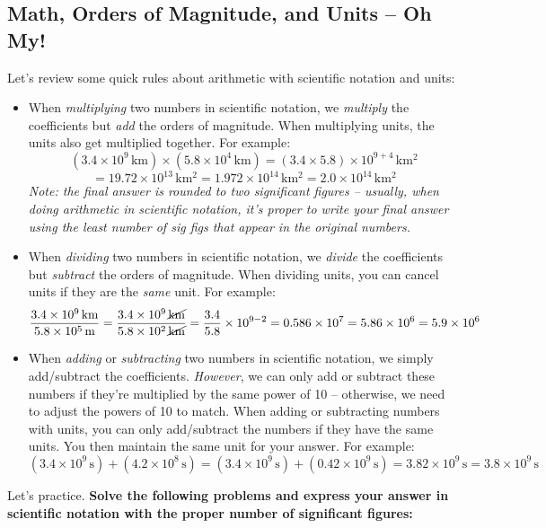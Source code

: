 \documentclass[11pt]{article}
\begin{document}
\subsection{Math, Orders of Magnitude, and Units -- Oh My!}

Let's review some quick rules about arithmetic with scientific notation and units:
\begin{itemize}
    \item When \textit{multiplying} two numbers in scientific notation, we \emph{multiply} the coefficients but \emph{add} the orders of magnitude. When multiplying units, the units also get multiplied together. For example:
    $$(3.4 \times 10^9 \,\mathrm{km}) \times (5.8 \times 10^4 \,\mathrm{km}) = (3.4 \times 5.8) \times 10^{9 + 4} \,\mathrm{km^2}$$ $$= 19.72 \times 10^{13} \,\mathrm{km^2} = 1.972 \times 10^{14} \,\mathrm{km^2} = 2.0 \times 10^{14}\,\mathrm{km^2}$$
    \textit{Note: the final answer is rounded to two significant figures -- usually, when doing arithmetic in scientific notation, it's proper to write your final answer using the \emph{least} number of sig figs that appear in the original numbers.}
    
    \item When \textit{dividing} two numbers in scientific notation, we \emph{divide} the coefficients but \emph{subtract} the orders of magnitude. When dividing units, you can cancel units if they are the \textit{same} unit. For example:
    $$\frac{3.4 \times 10^9 \,\mathrm{km}}{5.8 \times 10^5 \,\mathrm{m}} = \frac{3.4 \times 10^9 \,\cancel{\mathrm{km}}}{5.8 \times 10^2 \,\cancel{\mathrm{km}}} = \frac{3.4}{5.8} \times 10^{9-2} = 0.586 \times 10^7 = 5.86 \times 10^6 = 5.9 \times 10^6$$
    
    \item When \textit{adding} or \textit{subtracting} two numbers in scientific notation, we simply add/subtract the coefficients. \textit{However}, we can only add or subtract these numbers if they're multiplied by the same power of 10 -- otherwise, we need to adjust the powers of 10 to match. When adding or subtracting numbers with units, you can only add/subtract the numbers if they have the same units.  You then maintain the same unit for your answer. For example:
    $$(3.4 \times 10^9 \,\mathrm{s}) + (4.2 \times 10^8 \,\mathrm{s}) = (3.4 \times 10^9 \,\mathrm{s}) + (0.42 \times 10^9 \,\mathrm{s}) = 3.82 \times 10^9 \,\mathrm{s} = 3.8 \times 10^9 \,\mathrm{s}$$

\end{itemize}
\noindent
Let's practice.  \textbf{Solve the following problems and express your answer in scientific notation with the proper number of significant figures:}
\end{document}
